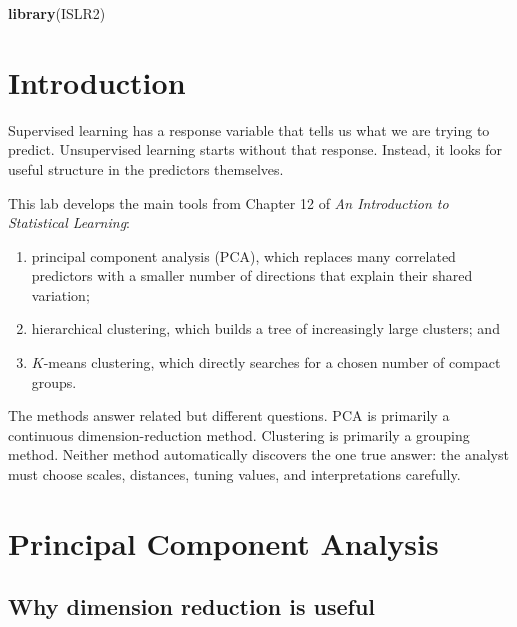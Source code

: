 \documentclass[
  11pt,
]{article}
\author{}
\date{\vspace{-2.5em}}
\newenvironment{Shaded}{\begin{snugshade}}{\end{snugshade}}
\newcommand{\FunctionTok}[1]{\textcolor[rgb]{0.13,0.29,0.53}{\textbf{#1}}}
\newcommand{\NormalTok}[1]{#1}
\providecommand{\tightlist}{%
  \setlength{\itemsep}{0pt}\setlength{\parskip}{0pt}}
\begin{document}

\begin{Shaded}
\begin{Highlighting}[]
\FunctionTok{library}\NormalTok{(ISLR2)}
\end{Highlighting}
\end{Shaded}

\section{Introduction}\label{introduction}

Supervised learning has a response variable that tells us what we are
trying to predict. Unsupervised learning starts without that response.
Instead, it looks for useful structure in the predictors themselves.

This lab develops the main tools from Chapter 12 of \emph{An
Introduction to Statistical Learning}:

\begin{enumerate}
\def\labelenumi{\arabic{enumi}.}
\tightlist
\item
  principal component analysis (PCA), which replaces many correlated
  predictors with a smaller number of directions that explain their
  shared variation;
\item
  hierarchical clustering, which builds a tree of increasingly large
  clusters; and
\item
  \(K\)-means clustering, which directly searches for a chosen number of
  compact groups.
\end{enumerate}

The methods answer related but different questions. PCA is primarily a
continuous dimension-reduction method. Clustering is primarily a
grouping method. Neither method automatically discovers the one true
answer: the analyst must choose scales, distances, tuning values, and
interpretations carefully.

\section{Principal Component
Analysis}\label{principal-component-analysis}

\subsection{Why dimension reduction is
useful}\label{why-dimension-reduction-is-useful}
\end{document}
